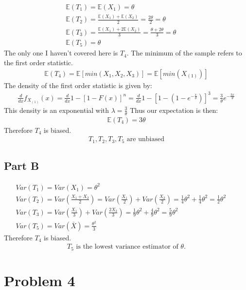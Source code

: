 \documentclass{article}
\begin{document}
\begin{align*}
\mathbb{E}(T_1) = \mathbb{E}(X_1) = \theta && \\
\mathbb{E}(T_2) = \frac{\mathbb{E}(X_1) + \mathbb{E}(X_2)}{2} = \frac{2\theta}{2} = \theta && \\
\mathbb{E}(T_3) = \frac{\mathbb{E}(X_1) + 2\mathbb{E}(X_2)}{3} = \frac{\theta+2\theta}{3} = \theta && \\
\mathbb{E}(T_5) = \theta
\end{align*}
The only one I haven't covered here is $T_4$. The minimum of the sample refers to the first order statistic.
\begin{align*}
\mathbb{E}(T_4) = \mathbb{E}[min(X_1,X_2,X_3)] = \mathbb{E}[min(X_{(1)})]
\end{align*}
The density of the first order statistic is given by:
\begin{align*}
\frac{d}{dx}f_{X_{(1)}}(x) = \frac{d}{dx} 1-[1-F(x)]^n = \frac{d}{dx} 1-[1-(1-e^{-\frac{x}{\theta}})]^3 = \frac{3}{\theta} e^{-\frac{3x}{\theta}}
\end{align*}
This density is an exponential with $\lambda = \frac{3}{\theta}$ Thus our expectation is then:
\begin{align*}
\mathbb{E}(T_4) = 3\theta
\end{align*}
Therefore $T_4$ is biased.
\begin{align*}
\boxed{ T_1,T_2,T_3,T_5 \text{ are unbiased} }
\end{align*} 
\subsection*{Part B}
\begin{align*}
Var(T_1) = Var(X_1) = \theta^2 && \\
Var(T_2) = Var( \frac{X_1 + X_2}{2} ) = Var(\frac{X_1}{2}) + Var(\frac{X_2}{2}) = \frac{1}{4}\theta^2 + \frac{1}{4}\theta^2 = \frac{1}{2}\theta^2 && \\
Var(T_3) = Var(\frac{X_1}{3}) + Var(\frac{2X_2}{3}) = \frac{1}{9}\theta^2 + \frac{4}{9}\theta^2 = \frac{5}{9} \theta^2 && \\
Var(T_5) = Var(\bar{X}) = \frac{\theta^2}{3}
\end{align*}
Therefore $T_4$ is biased.
\begin{align*}
\boxed{ T_5 \text{ is the lowest variance estimator of }\theta. }
\end{align*} 
\clearpage
\section*{Problem 4}
\end{document}
